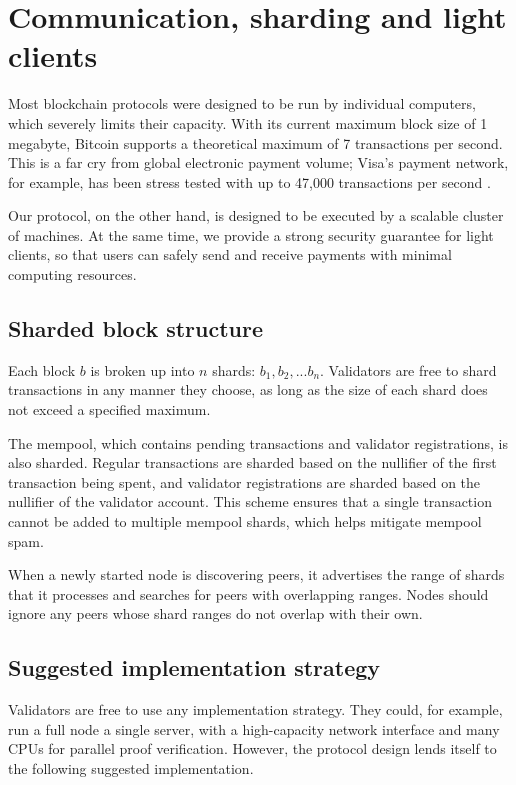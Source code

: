\section{Communication, sharding and light clients}
\label{sharding}

Most blockchain protocols were designed to be run by individual computers, which severely limits their capacity. With its current maximum block size of 1 megabyte, Bitcoin supports a theoretical maximum of 7 transactions per second. This is a far cry from global electronic payment volume; Visa's payment network, for example, has been stress tested with up to 47,000 transactions per second \cite{visa2013capacity}.

Our protocol, on the other hand, is designed to be executed by a scalable cluster of machines. At the same time, we provide a strong security guarantee for light clients, so that users can safely send and receive payments with minimal computing resources.


\subsection{Sharded block structure}

Each block $b$ is broken up into $n$ shards: $b_1, b_2, ... b_n$. Validators are free to shard transactions in any manner they choose, as long as the size of each shard does not exceed a specified maximum.

The mempool, which contains pending transactions and validator registrations, is also sharded. Regular transactions are sharded based on the nullifier of the first transaction being spent, and validator registrations are sharded based on the nullifier of the validator account. This scheme ensures that a single transaction cannot be added to multiple mempool shards, which helps mitigate mempool spam.

When a newly started node is discovering peers, it advertises the range of shards that it processes and searches for peers with overlapping ranges. Nodes should ignore any peers whose shard ranges do not overlap with their own.


\subsection{Suggested implementation strategy}

Validators are free to use any implementation strategy. They could, for example, run a full node a single server, with a high-capacity network interface and many CPUs for parallel proof verification. However, the protocol design lends itself to the following suggested implementation.

